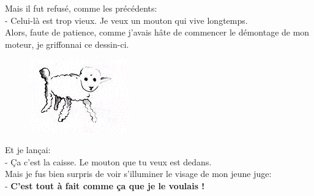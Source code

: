 \begin{multicols}{2}
  Mais il fut refusé, comme les précédents: \\
  - Celui-là est trop vieux. Je veux un mouton qui vive longtemps. \\
  Alors, faute de patience, comme j'avais hâte de commencer le démontage de mon moteur, je griffonnai ce dessin-ci.
  
  \begin{figure}[H]
    \centering
    \includegraphics[width=0.3\linewidth]{5x6-calcul-litteral/mouton2.png}
  \end{figure}

  Et je lançai: \\
  - Ça c'est la caisse. Le mouton que tu veux est dedans. \\
  Mais je fus bien surpris de voir s'illuminer le visage de mon jeune juge: \\
  - \textbf{C'est tout à fait comme ça que je le voulais ! }
\end{multicols}

